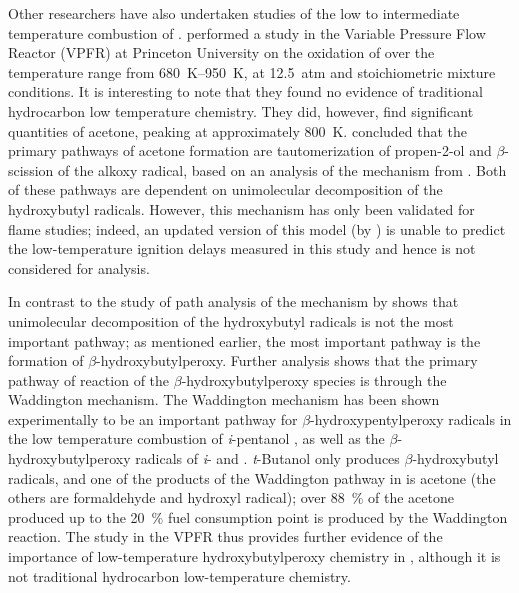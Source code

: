\documentclass[../main.tex]{subfiles}
\begin{document}
Other researchers have also undertaken studies of the low to intermediate
temperature combustion of \tBuOH{}. \textcite{Lefkowitz2012}
performed a study in the Variable Pressure Flow Reactor (VPFR) at Princeton
University on the oxidation of \tBuOH{} over the temperature range
from \SIrange{680}{950}{\kelvin}, at \SI{12.5}{atm} and stoichiometric mixture conditions. It is
interesting to note that they found no evidence of traditional hydrocarbon
low temperature chemistry. They did, however, find significant quantities of
acetone, peaking at approximately \SI{800}{\kelvin}. \textcite{Lefkowitz2012} concluded
that the primary pathways of acetone formation are tautomerization of
propen-2-ol and $\beta$-scission of the alkoxy radical, based on an analysis
of the mechanism from \textcite{Grana2010}. Both of these pathways are
dependent on unimolecular decomposition of the hydroxybutyl radicals. However,
this mechanism has only been validated for flame studies; indeed, an updated
version of this model (by \textcite{Frassoldati2012}) is unable to predict the
low-temperature ignition delays measured in this study and hence is not
considered for analysis.

In contrast to the study of \textcite{Lefkowitz2012} path analysis of the
mechanism by \textcite{Sarathy2012} shows that unimolecular decomposition
of the hydroxybutyl radicals is not the most important pathway; as mentioned
earlier, the most important pathway is the formation of
$\beta$-hydroxybutylperoxy. Further analysis shows that the primary pathway of
reaction of the \tBuOH{} $\beta$-hydroxybutylperoxy species is
through the Waddington mechanism. The Waddington mechanism has been shown
experimentally to be an important pathway for $\beta$-hydroxypentylperoxy
radicals in the low temperature combustion of \textit{i}-pentanol
\cite{Welz2012}, as well as the $\beta$-hydroxybutylperoxy radicals of
\textit{i}- and \tBuOH{} \cite{Welz2013b}. \textit{t}-Butanol only
produces $\beta$-hydroxybutyl radicals, and one of the products of the
Waddington pathway in \tBuOH{} is acetone (the others are
formaldehyde and hydroxyl radical); over \SI{88}{\percent} of the acetone produced up to the
\SI{20}{\percent} fuel consumption point is produced by the Waddington reaction. The study
in the VPFR thus provides further evidence of the importance of low-temperature
hydroxybutylperoxy chemistry in \tBuOH{}, although it is not
traditional hydrocarbon low-temperature chemistry.
\end{document}
